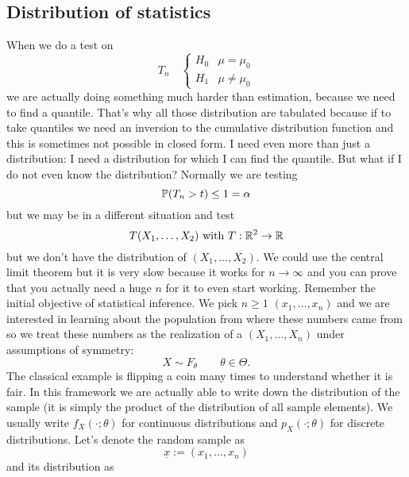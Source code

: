 \documentclass[12pt]{report}
\begin{document}
\subsection{Distribution of statistics}
When we do a test on 
\begin{equation*}
	T_{n}\quad\begin{cases}
		H_{0}&\mu=\mu_{0}\\
		H_{1}&\mu\neq\mu_{0}
	\end{cases}
\end{equation*}
we are actually doing something much harder than estimation, because we need to find a quantile. That's why all those distribution are tabulated because if to take quantiles we need an inversion to the cumulative distribution function and this is sometimes not possible in closed form. I need even more than just a distribution: I need a distribution for which I can find the quantile. But what if I do not even know the distribution? Normally we are testing
\begin{equation*}
	\mathbb{P}(T_{n}>t)\leq1=\alpha
\end{equation*}
but we may be in a different situation and test
\begin{equation*}
	T(X_{1},\ldots,X_{2})\text{ with }T:\mathbb{R}^{2}\to\mathbb{R}
\end{equation*}
but we don't have the distribution of $(X_{1},\ldots,X_{2})$. We could use the central limit theorem but it is very slow because it works for $n\to\infty$ and you can prove that you actually need a huge $n$ for it to even start working. 
Remember the initial objective of statistical inference. We pick $n\geq1$ $(x_{1},\ldots,x_{n})$ and we are interested in learning about the population from where these numbers came from so we treat these numbers as the realization of a \rv{} $(X_{1},\ldots,X_{n})$ under assumptions of symmetry:
\begin{equation*}
	X\sim F_{\theta}\qquad\theta\in\Theta.
\end{equation*}
The classical example is flipping a coin many times to understand whether it is fair. In this framework we are actually able to write down the distribution of the sample (it is simply the product of the distribution of all sample elements). We usually write $f_{X}(\cdot;\theta)$ for continuous distributions and $p_{X}(\cdot;\theta)$ for discrete distributions. Let's denote the random sample as
\begin{equation*}
	\underline{x}:=(x_{1},\ldots,x_{n})
\end{equation*}
and its distribution as
\end{document}

